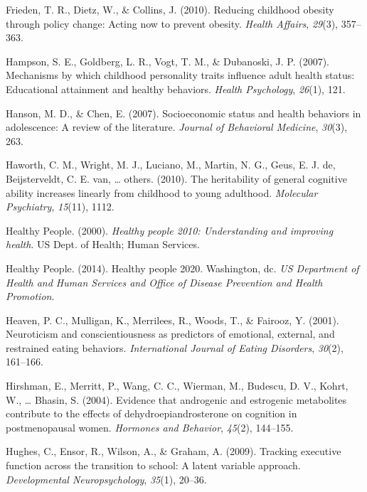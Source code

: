 \documentclass[man]{apa6}
\begin{document}
\leavevmode\hypertarget{ref-frieden2010reducing}{}%
Frieden, T. R., Dietz, W., \& Collins, J. (2010). Reducing childhood obesity through policy change: Acting now to prevent obesity. \emph{Health Affairs}, \emph{29}(3), 357--363.

\leavevmode\hypertarget{ref-hampson2007mechanisms}{}%
Hampson, S. E., Goldberg, L. R., Vogt, T. M., \& Dubanoski, J. P. (2007). Mechanisms by which childhood personality traits influence adult health status: Educational attainment and healthy behaviors. \emph{Health Psychology}, \emph{26}(1), 121.

\leavevmode\hypertarget{ref-hanson2007socioeconomic}{}%
Hanson, M. D., \& Chen, E. (2007). Socioeconomic status and health behaviors in adolescence: A review of the literature. \emph{Journal of Behavioral Medicine}, \emph{30}(3), 263.

\leavevmode\hypertarget{ref-haworth2010heritability}{}%
Haworth, C. M., Wright, M. J., Luciano, M., Martin, N. G., Geus, E. J. de, Beijsterveldt, C. E. van, \ldots{} others. (2010). The heritability of general cognitive ability increases linearly from childhood to young adulthood. \emph{Molecular Psychiatry}, \emph{15}(11), 1112.

\leavevmode\hypertarget{ref-healthy2000healthy}{}%
Healthy People. (2000). \emph{Healthy people 2010: Understanding and improving health}. US Dept. of Health; Human Services.

\leavevmode\hypertarget{ref-us2014healthy}{}%
Healthy People. (2014). Healthy people 2020. Washington, dc. \emph{US Department of Health and Human Services and Office of Disease Prevention and Health Promotion}.

\leavevmode\hypertarget{ref-heaven2001neuroticism}{}%
Heaven, P. C., Mulligan, K., Merrilees, R., Woods, T., \& Fairooz, Y. (2001). Neuroticism and conscientiousness as predictors of emotional, external, and restrained eating behaviors. \emph{International Journal of Eating Disorders}, \emph{30}(2), 161--166.

\leavevmode\hypertarget{ref-hirshman2004evidence}{}%
Hirshman, E., Merritt, P., Wang, C. C., Wierman, M., Budescu, D. V., Kohrt, W., \ldots{} Bhasin, S. (2004). Evidence that androgenic and estrogenic metabolites contribute to the effects of dehydroepiandrosterone on cognition in postmenopausal women. \emph{Hormones and Behavior}, \emph{45}(2), 144--155.

\leavevmode\hypertarget{ref-hughes2009tracking}{}%
Hughes, C., Ensor, R., Wilson, A., \& Graham, A. (2009). Tracking executive function across the transition to school: A latent variable approach. \emph{Developmental Neuropsychology}, \emph{35}(1), 20--36.
\end{document}
